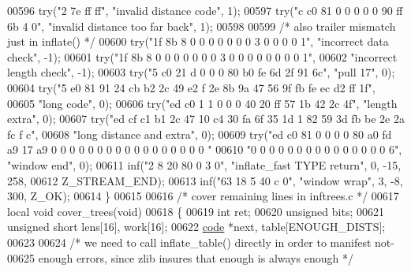 \begin{DoxyCode}
{{{{{00596     \textcolor{keywordflow}{try}(\textcolor{stringliteral}{"2 7e ff ff"}, \textcolor{stringliteral}{"invalid distance code"}, 1);
00597     \textcolor{keywordflow}{try}(\textcolor{stringliteral}{"c c0 81 0 0 0 0 0 90 ff 6b 4 0"}, \textcolor{stringliteral}{"invalid distance too far back"}, 1);
00598 
00599     \textcolor{comment}{/* also trailer mismatch just in inflate() */}
00600     \textcolor{keywordflow}{try}(\textcolor{stringliteral}{"1f 8b 8 0 0 0 0 0 0 0 3 0 0 0 0 1"}, \textcolor{stringliteral}{"incorrect data check"}, -1);
00601     \textcolor{keywordflow}{try}(\textcolor{stringliteral}{"1f 8b 8 0 0 0 0 0 0 0 3 0 0 0 0 0 0 0 0 1"},
00602         \textcolor{stringliteral}{"incorrect length check"}, -1);
00603     \textcolor{keywordflow}{try}(\textcolor{stringliteral}{"5 c0 21 d 0 0 0 80 b0 fe 6d 2f 91 6c"}, \textcolor{stringliteral}{"pull 17"}, 0);
00604     \textcolor{keywordflow}{try}(\textcolor{stringliteral}{"5 e0 81 91 24 cb b2 2c 49 e2 f 2e 8b 9a 47 56 9f fb fe ec d2 ff 1f"},
00605         \textcolor{stringliteral}{"long code"}, 0);
00606     \textcolor{keywordflow}{try}(\textcolor{stringliteral}{"ed c0 1 1 0 0 0 40 20 ff 57 1b 42 2c 4f"}, \textcolor{stringliteral}{"length extra"}, 0);
00607     \textcolor{keywordflow}{try}(\textcolor{stringliteral}{"ed cf c1 b1 2c 47 10 c4 30 fa 6f 35 1d 1 82 59 3d fb be 2e 2a fc f c"},
00608         \textcolor{stringliteral}{"long distance and extra"}, 0);
00609     \textcolor{keywordflow}{try}(\textcolor{stringliteral}{"ed c0 81 0 0 0 0 80 a0 fd a9 17 a9 0 0 0 0 0 0 0 0 0 0 0 0 0 0 0 0 0 "}
00610         \textcolor{stringliteral}{"0 0 0 0 0 0 0 0 0 0 0 0 0 0 0 6"}, \textcolor{stringliteral}{"window end"}, 0);
00611     inf(\textcolor{stringliteral}{"2 8 20 80 0 3 0"}, \textcolor{stringliteral}{"inflate\_fast TYPE return"}, 0, -15, 258,
00612         Z\_STREAM\_END);
00613     inf(\textcolor{stringliteral}{"63 18 5 40 c 0"}, \textcolor{stringliteral}{"window wrap"}, 3, -8, 300, Z\_OK);
00614 \}
00615 
00616 \textcolor{comment}{/* cover remaining lines in inftrees.c */}
00617 local \textcolor{keywordtype}{void} cover\_trees(\textcolor{keywordtype}{void})
00618 \{
00619     \textcolor{keywordtype}{int} ret;
00620     \textcolor{keywordtype}{unsigned} bits;
00621     \textcolor{keywordtype}{unsigned} \textcolor{keywordtype}{short} lens[16], work[16];
00622     \hyperlink{structcode}{code} *next, table[ENOUGH\_DISTS];
00623 
00624     \textcolor{comment}{/* we need to call inflate\_table() directly in order to manifest not-}
00625 \textcolor{comment}{       enough errors, since zlib insures that enough is always enough */}
}}}}}
\end{DoxyCode}
